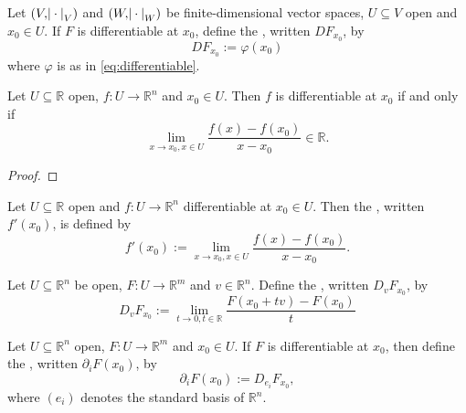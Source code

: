 \begin{definition}[Differential]
	Let $(V,\abs{\>\cdot\>}_V)$ and $(W,\abs{\>\cdot\>}_W)$ be finite-dimensional vector spaces, $U \subseteq V$ open and $x_0 \in U$. If $F$ is differentiable at $x_0$, define the , written $DF_{x_0}$, by
	\begin{equation*}
		DF_{x_0} := \varphi(x_0)
	\end{equation*}
	\noindent where $\varphi$ is as in \textup{\ref{eq:differentiable}}.
\end{definition}

\begin{lemma}
	Let $U \subseteq \mathbb{R}$ open, $f : U \to \mathbb{R}^n$ and $x_0 \in U$. Then $f$ is differentiable at $x_0$ if and only if 
	\begin{equation}
		\lim_{x \to x_0, x \in U} \frac{f(x) - f(x_0)}{x - x_0} \in \mathbb{R}.
	\end{equation}
\end{lemma}

\begin{proof}
	
\end{proof}

\begin{definition}[Derivative]
	Let $U \subseteq \mathbb{R}$ open and $f : U \to \mathbb{R}^n$ differentiable at $x_0 \in U$. Then the , written $f'(x_0)$, is defined by
	\begin{equation*}
		f'(x_0) := \lim_{x \to x_0, x \in U} \frac{f(x) - f(x_0)}{x - x_0}.
	\end{equation*}
\end{definition}

\begin{definition}
	Let $U \subseteq \mathbb{R}^n$ be open, $F : U \to \mathbb{R}^m$ and $v \in \mathbb{R}^n$. Define the , written $D_vF_{x_0}$, by
	\begin{equation*}
		D_vF_{x_0} := \lim_{t \to 0, t \in \mathbb{R}}\frac{F(x_0 + tv) - F(x_0)}{t}
	\end{equation*} 
\end{definition}

\begin{definition}
	Let $U \subseteq \mathbb{R}^n$ open, $F : U \to \mathbb{R}^m$ and $x_0 \in U$. If $F$ is differentiable at $x_0$, then define the , written $\partial_iF(x_0)$, by
	\begin{equation*}
		\partial_iF(x_0) := D_{e_i}F_{x_0},
	\end{equation*} 
	\noindent where $(e_i)$ denotes the standard basis of $\mathbb{R}^n$.
\end{definition}

